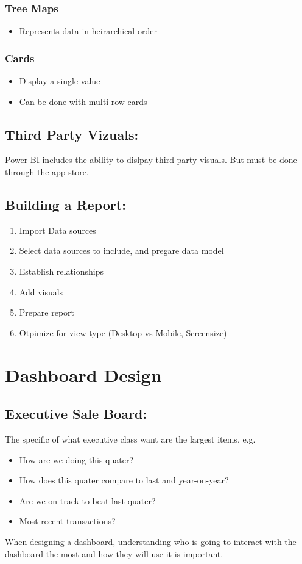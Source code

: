 \documentclass[a5paper]{article}
\begin{document}
	\subsubsection{Tree Maps}
	\begin{itemize}
		\item Represents data in heirarchical order
	\end{itemize}
	\subsubsection{Cards}
	\begin{itemize}
		\item Display a single value
		\item Can be done with multi-row cards
	\end{itemize}
	\subsection{Third Party Vizuals:}
	Power BI includes the ability to dislpay third party visuals. But must be done through the app store.
	\subsection{Building a Report:}
	\begin{enumerate}
		\item Import Data sources
		\item Select data sources to include, and pregare data model
		\item Establish relationships
		\item Add visuals
		\item Prepare report
		\item Otpimize for view type (Desktop vs Mobile, Screensize)
	\end{enumerate}

	\section{Dashboard Design}
	\subsection{Executive Sale Board:}
	The specific of what executive class want are the largest items, e.g.
	\begin{itemize}
		\item How are we doing this quater?
		\item How does this quater compare to last and year-on-year?
		\item Are we on track to beat last quater?
		\item Most recent transactions?
	\end{itemize}
	When designing a dashboard, understanding who is going to interact with the dashboard the most and how they will use it is important.
\end{document}
